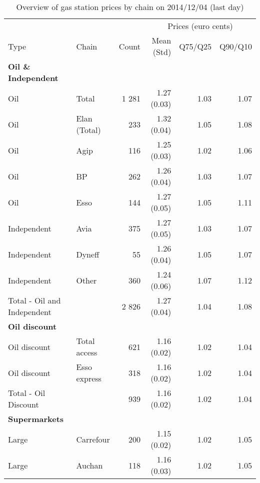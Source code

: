 \documentclass[english]{article}
\begin{document}
\begin{table}
\begin{threeparttable}
\renewcommand{\arraystretch}{0.8} %
\caption{Overview of gas station prices by chain on 2014/12/04 (last day)}
\label{tab:station_chains}
    \begin{tabular}{lrrrrr}
    \toprule
    \toprule
          &       &       & \multicolumn{3}{c}{Prices (euro cents)} \\
    Type  & \multicolumn{1}{l}{Chain} & Count & Mean (Std) & Q75/Q25 & Q90/Q10 \\
    \midrule
    \textbf{Oil \& Independent} &       &       &       &       &  \\
    Oil   & \multicolumn{1}{l}{Total} & 1 281 & 1.27 (0.03) & 1.03  & 1.07 \\
    Oil   & \multicolumn{1}{l}{Elan (Total)} & 233   & 1.32 (0.04) & 1.05  & 1.08 \\
    Oil   & \multicolumn{1}{l}{Agip} & 116   & 1.25 (0.03) & 1.02  & 1.06 \\
    Oil  & \multicolumn{1}{l}{BP} & 262   & 1.26 (0.04) & 1.03  & 1.07 \\
    Oil  & \multicolumn{1}{l}{Esso} & 144   & 1.27 (0.05) & 1.05  & 1.11 \\
    Independent & \multicolumn{1}{l}{Avia} & 375   & 1.27 (0.05) & 1.03  & 1.07 \\
    Independent & \multicolumn{1}{l}{Dyneff} & 55    & 1.26 (0.04) & 1.05  & 1.07 \\
    Independent & \multicolumn{1}{l}{Other} & 360   & 1.24 (0.06) & 1.07  & 1.12 \\
    \midrule
    Total - Oil and Independent &       & 2 826 & 1.27 (0.04) & 1.04  & 1.08 \\
    \midrule
    \textbf{Oil discount} &       &       &       &       &  \\
    Oil discount & \multicolumn{1}{l}{Total access} & 621   & 1.16 (0.02) & 1.02  & 1.04 \\
    Oil discount & \multicolumn{1}{l}{Esso express} & 318   & 1.16 (0.02) & 1.02  & 1.04 \\
    \midrule
    Total - Oil Discount &       & 939   & 1.16 (0.02) & 1.02  & 1.04 \\
    \midrule
    \textbf{Supermarkets} &       &       &       &       &  \\
    Large & \multicolumn{1}{l}{Carrefour} & 200   & 1.15 (0.02) & 1.02  & 1.05 \\
    Large & \multicolumn{1}{l}{Auchan} & 118   & 1.16 (0.03) & 1.02  & 1.05 \\

\end{tabular}
\end{threeparttable}
\end{table}
\end{document}
